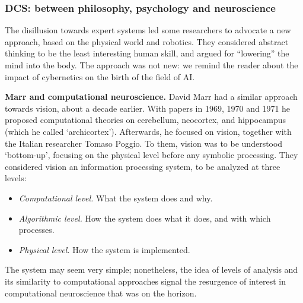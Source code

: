\documentclass[../main.tex]{subfiles}
\begin{document}
\subsubsection{DCS: between philosophy, psychology and neuroscience}
The disillusion towards expert systems led some researchers to advocate a new approach, based on the physical world and robotics. They considered abstract thinking to be the least interesting human skill, and argued for ``lowering'' the mind into the body. The approach was not new: we remind the reader about the impact of cybernetics on the birth of the field of AI.

\vspace{4pt}
\textbf{Marr and computational neuroscience.}
David Marr had a similar approach towards vision, about a decade earlier. With papers in 1969, 1970 and 1971 he proposed computational theories on cerebellum\cite{marrTheoryCerebellarCortex1969}, neocortex\cite{marrTheoryCerebralNeocortex1970}, and hippocampus (which he called `archicortex')\cite{marrSimpleMemoryTheory1971}. Afterwards, he focused on vision, together with the Italian researcher Tomaso Poggio. To them, vision was to be understood `bottom-up', focusing on the physical level before any symbolic processing. They considered vision an information processing system, to be analyzed at three levels\cite{marrUnderstandingComputationUnderstanding1976}:

\begin{itemize}
    \item \textit{Computational level.} What the system does and why.
    \item \textit{Algorithmic level.} How the system does what it does, and with which processes.
    \item \textit{Physical level.} How the system is implemented.
\end{itemize}

The system may seem very simple; nonetheless, the idea of levels of analysis and its similarity to computational approaches signal the resurgence of interest in computational neuroscience that was on the horizon.
\end{document}
